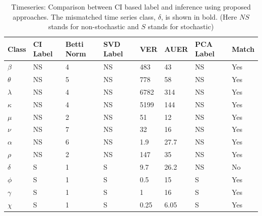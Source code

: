 \documentclass[journal]{IEEEtran}
\begin{document}
	
	
	\begin{table}[t]
		\caption{Timeseries: Comparison between CI based label and inference using proposed approaches. The mismatched time series class, $\delta$, is shown in bold. (Here $NS$ stands for non-stochastic and $S$ stands for stochastic)}
		\begin{center}
			\begin{tabular}{|p{0.5cm}|p{0.75cm}|p{0.75cm}|p{0.75cm}|p{0.75cm}|p{1cm}|p{0.5cm}|p{0.75cm}|}
				\hline
				Class & CI \newline Label & Betti Norm & SVD \newline Label & VER & AUER & PCA \newline Label  &  Match \\
				\hline
				$\beta$ & NS & 4 & NS & 483 & 43 & NS & Yes\\
			\hline
				$\theta$  & NS &  5 & NS & 778 & 58 & NS  &  Yes \\
				\hline
			$\lambda$ & NS & 4 & NS & 6782 & 314 & NS & Yes \\
			\hline
				$\kappa$ & NS & 4 & NS & 5199 & 144 & NS & Yes \\
			\hline
		$\mu$ & NS & 2 & NS & 51 & 12 & NS & Yes \\
		\hline
			$\nu$ & NS & 7 & NS & 32 & 16 & NS & Yes \\
			\hline
$\alpha$ & NS & 6 & NS & 1.9 & 27.7 & NS & Yes \\
\hline
$\rho$ & NS & 2 & NS & 147 & 35 & NS & Yes \\
\hline
$\delta$ & S & 1 & S & 9.7 & 26.2 & NS & No \\
\hline
$\phi$ & S & 1 & S & 0.5 & 15 & S & Yes \\
\hline
$\gamma$ & S & 1 & S & 1 & 16 & S & Yes \\
\hline
$\chi$ & S & 1 & S & 0.25 & 6.05 & S & Yes \\
\hline
			\end{tabular}
			\label{tab:results_1}
		\end{center}
	\end{table}
	
\end{document}

